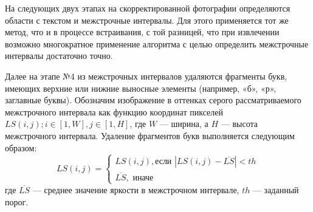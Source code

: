 \documentclass[12pt,a4paper]{article}
\begin{document}
На следующих двух этапах на скорректированной фотографии определяются области с текстом и межстрочные интервалы.
Для этого применяется тот же метод, что и в процессе встраивания, с той разницей, что при извлечении возможно многократное применение алгоритма с целью определить межстрочные интервалы достаточно точно.

Далее на этапе №4 из межстрочных интервалов удаляются фрагменты букв, имеющих верхние или нижние выносные элементы (например, «б», «р», заглавные буквы).
Обозначим изображение в оттенках серого рассматриваемого межстрочного интервала как функцию координат пикселей $LS(i,j); i\in[1,W],j\in[1,H]$, где $W$ — ширина, а $H$ — высота межстрочного интервала. Удаление фрагментов букв выполняется следующим образом:
$$LS(i,j) = \begin{cases}LS(i,j),\text{если } |LS(i,j) - \overline{LS}|< th\\\overline{LS}, \text{ иначе} \end{cases}$$
где $\overline{LS}$ — среднее значение яркости в межстрочном интервале,  $th$ — заданный порог.
\end{document}
